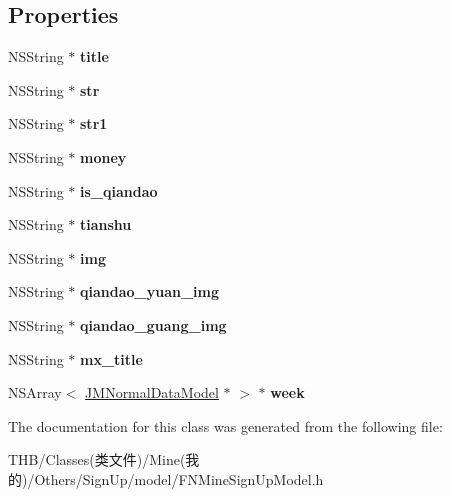 \subsection*{Properties}
\begin{DoxyCompactItemize}
\item 
\mbox{\label{interface_f_n_mine_sign_up_model_a75f5bf475811064fe3092c47ac36743d}} 
N\+S\+String $\ast$ {\bfseries title}
\item 
\mbox{\label{interface_f_n_mine_sign_up_model_ab6bb49e30085a674556229c7d9b79124}} 
N\+S\+String $\ast$ {\bfseries str}
\item 
\mbox{\label{interface_f_n_mine_sign_up_model_ab36d46b65560b260d5f2864cfcbe36a6}} 
N\+S\+String $\ast$ {\bfseries str1}
\item 
\mbox{\label{interface_f_n_mine_sign_up_model_a04c1e7b85b86323516c37a2c012af661}} 
N\+S\+String $\ast$ {\bfseries money}
\item 
\mbox{\label{interface_f_n_mine_sign_up_model_af51e3a3e043f1fe6635686735682fcc4}} 
N\+S\+String $\ast$ {\bfseries is\+\_\+qiandao}
\item 
\mbox{\label{interface_f_n_mine_sign_up_model_ad9ba3746ad9821a80d4b9a62eb641d83}} 
N\+S\+String $\ast$ {\bfseries tianshu}
\item 
\mbox{\label{interface_f_n_mine_sign_up_model_ac349406e9091da9f650e56681b179721}} 
N\+S\+String $\ast$ {\bfseries img}
\item 
\mbox{\label{interface_f_n_mine_sign_up_model_a82391c981b22682542b13db3d2677715}} 
N\+S\+String $\ast$ {\bfseries qiandao\+\_\+yuan\+\_\+img}
\item 
\mbox{\label{interface_f_n_mine_sign_up_model_a0b602aad3341eb2369fe340646e2b73f}} 
N\+S\+String $\ast$ {\bfseries qiandao\+\_\+guang\+\_\+img}
\item 
\mbox{\label{interface_f_n_mine_sign_up_model_ad55c92c8aa9fa7fd72b624c888e6d353}} 
N\+S\+String $\ast$ {\bfseries mx\+\_\+title}
\item 
\mbox{\label{interface_f_n_mine_sign_up_model_a2d2941f926838cf5870253fcdc19e0fd}} 
N\+S\+Array$<$ \mbox{\hyperlink{interface_j_m_normal_data_model}{J\+M\+Normal\+Data\+Model}} $\ast$ $>$ $\ast$ {\bfseries week}
\end{DoxyCompactItemize}


The documentation for this class was generated from the following file\+:\begin{DoxyCompactItemize}
\item 
T\+H\+B/\+Classes(类文件)/\+Mine(我的)/\+Others/\+Sign\+Up/model/F\+N\+Mine\+Sign\+Up\+Model.\+h\end{DoxyCompactItemize}
